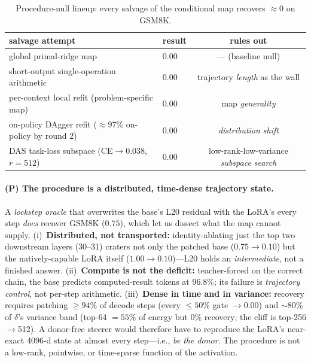 \documentclass{article}
\begin{document}
\begin{table}[h]
\centering
\caption{Procedure-null lineup: every salvage of the conditional map recovers $\approx 0$ on GSM8K.}
\label{tab:procedure}
\small
\setlength{\tabcolsep}{5pt}
\begin{tabular}{llc}
\toprule
salvage attempt & result & rules out \\
\midrule
global primal-ridge map & 0.00 & --- (baseline null) \\
short-output single-operation arithmetic & 0.00 & trajectory \emph{length} as the wall \\
per-context local refit (problem-specific map) & 0.00 & map \emph{generality} \\
on-policy DAgger refit (${\approx}97\%$ on-policy by round 2) & 0.00 & \emph{distribution shift} \\
DAS task-loss subspace (CE${\to}0.038$, $r{=}512$) & 0.00 & low-rank-low-variance \emph{subspace search} \\
\bottomrule
\end{tabular}
\end{table}

\paragraph{(P) The procedure is a distributed, time-dense trajectory state.}
A \emph{lockstep oracle} that overwrites the base's L20 residual with the LoRA's every step \emph{does}
recover GSM8K ($0.75$), which let us dissect what the map cannot supply. (i)~\textbf{Distributed, not
transported:} identity-ablating just the top two downstream layers (30--31) craters not only the
patched base ($0.75 \to 0.10$) but the natively-capable LoRA itself ($1.00 \to 0.10$)---L20 holds an
\emph{intermediate}, not a finished answer. (ii)~\textbf{Compute is not the deficit:} teacher-forced
on the correct chain, the base predicts computed-result tokens at $96.8\%$; its failure is
\emph{trajectory control}, not per-step arithmetic. (iii)~\textbf{Dense in time and in variance:}
recovery requires patching ${\geq}94\%$ of decode steps (every ${\leq}50\%$ gate $\to 0.00$) and
${\sim}80\%$ of $\delta$'s variance band (top-64 $=55\%$ of energy but $0\%$ recovery; the cliff is
top-256$\to$512). A donor-free steerer would therefore have to reproduce the LoRA's near-exact
4096-d state at almost every step---i.e., \emph{be the donor}. The procedure is not a low-rank,
pointwise, or time-sparse function of the activation.
\end{document}
